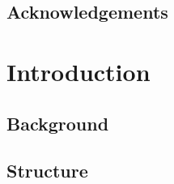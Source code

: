 \documentclass[]{book}
\begin{document}
\hypertarget{acknowledgements}{%
\section{Acknowledgements}\label{acknowledgements}}

\hypertarget{introduction}{%
\chapter{Introduction}\label{introduction}}

\hypertarget{background}{%
\section{Background}\label{background}}

\hypertarget{structure}{%
\section{Structure}\label{structure}}


\end{document}
